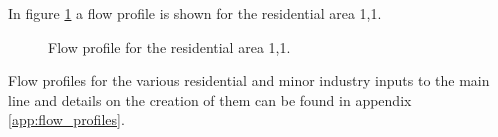 In figure \ref{fig:flow_profile_thulevej} a flow profile is shown for the residential area 1,1. 


\begin{figure}[H]
\centering

\caption{Flow profile for the residential area 1,1.}
\label{fig:flow_profile_thulevej}
\end{figure}  

Flow profiles for the various residential and minor industry inputs to the main line and details on the creation of them can be found in appendix \ref{app:flow_profiles}.


